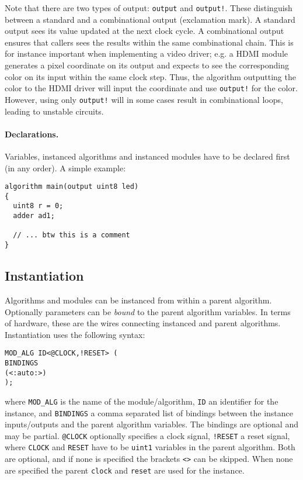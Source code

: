\documentclass[a4]{article}
\begin{document}
Note that there are two types of output: \texttt{output} and \texttt{output!}. These distinguish between a standard and a combinational output (exclamation mark). A standard output sees its value updated at the next clock cycle. A combinational output ensures that callers sees the results within the same combinational chain. This is for instance important when implementing a video driver; e.g. a HDMI module generates a pixel coordinate on its output and expects to see the corresponding color on its input within the same clock step. Thus, the algorithm outputting the color to the HDMI driver will input the coordinate and use \texttt{output!} for the color. However, using only \texttt{output!} will in some cases result in combinational loops, leading to unstable circuits.


\paragraph{Declarations.} Variables, instanced algorithms and instanced modules have to be declared first (in any order). A simple example:

\begin{verbatim}
algorithm main(output uint8 led)
{
  uint8 r = 0;
  adder ad1;
  
  // ... btw this is a comment
}
\end{verbatim}


\subsection{Instantiation}
\label{sec:instantiation}

Algorithms and modules can be instanced from within a parent algorithm. Optionally parameters can be \textit{bound} to the parent algorithm variables. 
In terms of hardware, these are the wires connecting instanced and parent algorithms.
%
Instantiation uses the following syntax:
%
\begin{verbatim}
MOD_ALG ID<@CLOCK,!RESET> (
BINDINGS
(<:auto:>)
);
\end{verbatim}
%
where \texttt{MOD\_ALG} is the name of the module/algorithm, \texttt{ID} an
identifier for the instance, and \texttt{BINDINGS} a comma separated list of 
bindings between the instance inputs/outputs and the parent algorithm variables.
The bindings are optional and may be partial.
\texttt{@CLOCK} optionally specifies a clock signal, \texttt{!RESET} a reset signal, where \texttt{CLOCK} and \texttt{RESET} have to be \texttt{uint1} variables in the parent algorithm. Both are optional, and if none is specified the brackets \texttt{<>} can be skipped. When none are specified the parent \texttt{clock} and \texttt{reset} are used for the instance.
\end{document}
